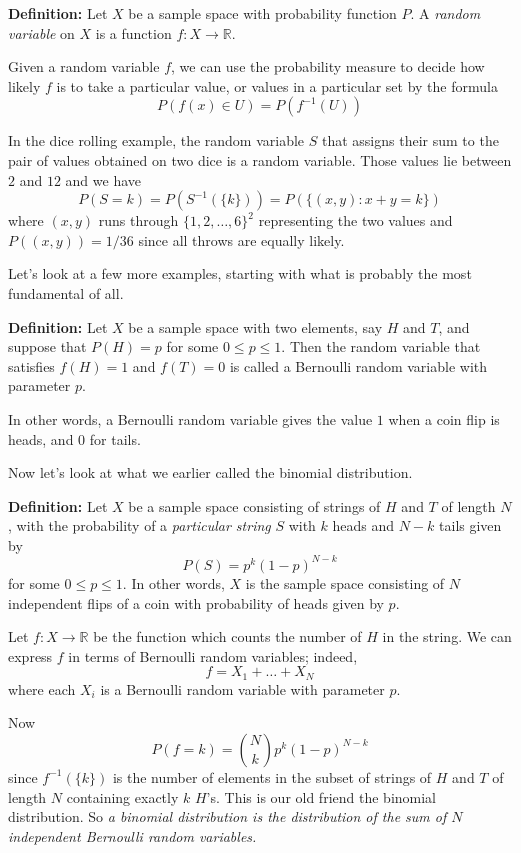 \documentclass[
  11pt,
  letterpaper,
]{scrbook}
\theoremstyle{plain}
\theoremstyle{plain}
\theoremstyle{remark}
\begin{document}
\textbf{Definition:} Let \(X\) be a sample space with probability
function \(P\). A \emph{random variable} on \(X\) is a function
\(f:X\to \mathbb{R}\).

Given a random variable \(f\), we can use the probability measure to
decide how likely \(f\) is to take a particular value, or values in a
particular set by the formula \[
P(f(x)\in U) = P(f^{-1}(U))
\]

In the dice rolling example, the random variable \(S\) that assigns
their sum to the pair of values obtained on two dice is a random
variable. Those values lie between \(2\) and \(12\) and we have \[
P(S=k) = P(S^{-1}(\{k\}))=P(\{(x,y): x+y=k\})
\] where \((x,y)\) runs through \(\{1,2,\ldots,6\}^{2}\) representing
the two values and \(P((x,y))=1/36\) since all throws are equally
likely.

Let's look at a few more examples, starting with what is probably the
most fundamental of all.

\textbf{Definition:} Let \(X\) be a sample space with two elements, say
\(H\) and \(T\), and suppose that \(P(H)=p\) for some \(0\le p\le 1\).
Then the random variable that satisfies \(f(H)=1\) and \(f(T)=0\) is
called a Bernoulli random variable with parameter \(p\).

In other words, a Bernoulli random variable gives the value \(1\) when a
coin flip is heads, and \(0\) for tails.

Now let's look at what we earlier called the binomial distribution.

\textbf{Definition:} Let \(X\) be a sample space consisting of strings
of \(H\) and \(T\) of length \(N\), with the probability of a
\emph{particular string} \(S\) with \(k\) heads and \(N-k\) tails given
by \[
P(S)=p^{k}(1-p)^{N-k}
\] for some \(0\le p\le 1\). In other words, \(X\) is the sample space
consisting of \(N\) independent flips of a coin with probability of
heads given by \(p\).

Let \(f:X\to \mathbb{R}\) be the function which counts the number of
\(H\) in the string. We can express \(f\) in terms of Bernoulli random
variables; indeed, \[
f=X_1+\ldots+X_N
\] where each \(X_i\) is a Bernoulli random variable with parameter
\(p\).

Now \[
P(f=k) = \binom{N}{k}p^{k}(1-p)^{N-k}
\] since \(f^{-1}(\{k\})\) is the number of elements in the subset of
strings of \(H\) and \(T\) of length \(N\) containing exactly \(k\)
\(H\)'s. This is our old friend the binomial distribution. So \emph{a
binomial distribution is the distribution of the sum of \(N\)
independent Bernoulli random variables.}
\end{document}
